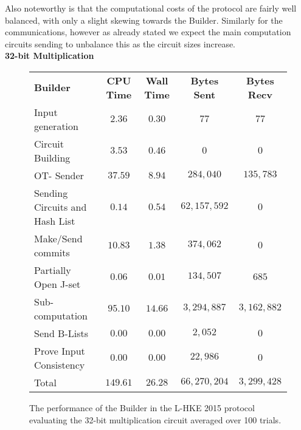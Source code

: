 \documentclass[ %
                    author={Nicholas Tutte},
                supervisor={Prof. Nigel Smart},
                    degree={MEng},
                     title={Secure Two Party Computation},
                  subtitle={A practical comparison of recent protocols},
                      type={Research - GG1K},
                      year={2015} ]{dissertation}
\begin{document}
				Also noteworthy is that the computational costs of the protocol are fairly well balanced, with only a slight skewing towards the Builder. Similarly for the communications, however as already stated we expect the main computation circuits sending to unbalance this as the circuit sizes increase.\\

				\pagebreak
				\FloatBarrier
				\noindent \textbf{32-bit Multiplication}
				\begin{figure}[!ht]
					\begin{tabular}{| p{4.3cm} | c c c c |}
						\hline
						\textbf{Builder} & \textbf{CPU Time} & \textbf{Wall Time} & \textbf{Bytes Sent} & \textbf{Bytes Recv} \\
						\thickhline
						Input generation & $2.36$ & $0.30$ & $77$ & $77$ \\
						\hline
						Circuit Building & $3.53$ & $0.46$ & $0$ & $0$ \\
						\hline
						OT- Sender & $37.59$ & $8.94$ & $284,040$ & $135,783$ \\
						\hline
						Sending Circuits and Hash List & $0.14$ & $0.54$ & $62,157,592$ & $0$ \\
						\hline
						Make/Send commits & $10.83$ & $1.38$ & $374,062$ & $0$ \\
						\hline
						Partially Open J-set & $0.06$ & $0.01$ & $134,507$ & $685$ \\
						\hline
						Sub-computation & $95.10$ & $14.66$ & $3,294,887$ & $3,162,882$\\
						\hline
						Send B-Lists & $0.00$ & $0.00$ & $2,052$ & $0$ \\
						\hline
						Prove Input Consistency & $0.00$ & $0.00$ & $22,986$ & $0$ \\
						\thickhline
						Total & $149.61$ & $26.28$ & $66,270,204$ & $3,299,428$ \\
						\hline
					\end{tabular}
					\caption{The performance of the Builder in the L-HKE 2015 protocol evaluating the 32-bit multiplication circuit averaged over 100 trials. \label{table:L-HKE_2015_Mul_Builder}}
				\end{figure}
\end{document}
